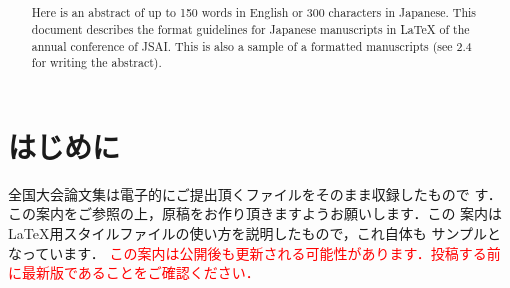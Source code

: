 \usepackage{color}

\title{
}


\author{%
\and
{}
}



\begin{abstract}
Here is an abstract of up to 150 words in English or 300 characters in Japanese. 
This document describes the format guidelines for Japanese manuscripts in \LaTeX{} of the annual conference of JSAI. 
This is also a sample of a formatted manuscripts (see 2.4 for writing the abstract).
\end{abstract}

\def\Style{``jsaiac.sty''}
\def\BibTeX{{\rm B\kern-.05em{\sc i\kern-.025em b}\kern-.08em%
 T\kern-.1667em\lower.7ex\hbox{E}\kern-.125emX}}
\def\JBibTeX{\leavevmode\lower .6ex\hbox{J}\kern-0.15em\BibTeX}
\def\LaTeXe{\LaTeX\kern.15em2$_{\textstyle\varepsilon}$}


\maketitle

\section{はじめに}
全国大会論文集は電子的にご提出頂くファイルをそのまま収録したもので
す．この案内をご参照の上，原稿をお作り頂きますようお願いします．この
案内は \LaTeX 用スタイルファイルの使い方を説明したもので，これ自体も
サンプルとなっています．
\textcolor{red}{この案内は公開後も更新される可能性があります．投稿する前に最新版であることをご確認ください．}

